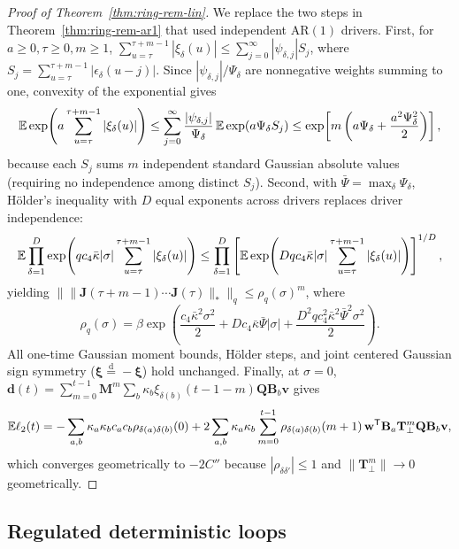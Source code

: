 \begin{proof}[Proof of Theorem~{\upshape\ref{thm:ring-rem-lin}}]
We replace the two steps in Theorem~\ref{thm:ring-rem-ar1} that used independent $\mathrm{AR}(1)$ drivers. First, for $a \ge 0, \tau \ge 0, m \ge 1$, $\sum_{u=\tau}^{\tau+m-1} |\xi_\delta(u)| \le \sum_{j=0}^{\infty} |\psi_{\delta,j}| S_j$, where $S_j = \sum_{u=\tau}^{\tau+m-1} |\epsilon_\delta(u - j)|$. Since $|\psi_{\delta,j}|/\Psi_\delta$ are nonnegative weights summing to one, convexity of the exponential gives
\[
\mathbb{E}\exp\!\left(a\sum_{u=\tau}^{\tau+m-1} |\xi_\delta(u)|\right) \le \sum_{j=0}^{\infty} \frac{|\psi_{\delta,j}|}{\Psi_\delta}\,\mathbb{E}\exp(a\Psi_\delta S_j) \le \exp\!\left[m\left(a\Psi_\delta + \frac{a^2\Psi_\delta^2}{2}\right)\right],
\]
because each $S_j$ sums $m$ independent standard Gaussian absolute values (requiring no independence among distinct $S_j$). Second, with $\bar{\Psi} = \max_\delta \Psi_\delta$, H\"older's inequality with $D$ equal exponents across drivers replaces driver independence:
\[
\mathbb{E}\prod_{\delta=1}^D \exp\!\left(q c_4\bar{\kappa}|\sigma|\sum_{u=\tau}^{\tau+m-1} |\xi_\delta(u)|\right) \le \prod_{\delta=1}^D \left[\mathbb{E}\exp\!\left(D q c_4\bar{\kappa}|\sigma|\sum_{u=\tau}^{\tau+m-1} |\xi_\delta(u)|\right)\right]^{1/D},
\]
yielding $\bigl\|\|\mathbf{J}(\tau + m - 1)\cdots\mathbf{J}(\tau)\|_*\bigr\|_q \le \rho_q(\sigma)^m$, where
\[
\rho_q(\sigma) = \beta\exp\!\left(\frac{c_4\bar{\kappa}^2\sigma^2}{2} + D c_4\bar{\kappa}\bar{\Psi}|\sigma| + \frac{D^2 q c_4^2\bar{\kappa}^2\bar{\Psi}^2\sigma^2}{2}\right).
\]
All one-time Gaussian moment bounds, H\"older steps, and joint centered Gaussian sign symmetry ($\boldsymbol{\xi} \stackrel{\mathrm{d}}{=} -\boldsymbol{\xi}$) hold unchanged. Finally, at $\sigma = 0$, $\mathbf{d}(t) = \sum_{m=0}^{t-1} \mathbf{M}^m \sum_b \kappa_b\xi_{\delta(b)}(t - 1 - m)\mathbf{Q}\mathbf{B}_b\mathbf{v}$ gives
\[
\mathbb{E}\ell_2(t) = -\sum_{a,b} \kappa_a\kappa_b c_a c_b\rho_{\delta(a)\delta(b)}(0) + 2\sum_{a,b} \kappa_a\kappa_b \sum_{m=0}^{t-1} \rho_{\delta(a)\delta(b)}(m + 1)\,\mathbf{w}^{\mathsf{T}}\mathbf{B}_a\mathbf{T}_\perp^m\mathbf{Q}\mathbf{B}_b\mathbf{v},
\]
which converges geometrically to $-2C''$ because $|\rho_{\delta\delta'}| \le 1$ and $\|\mathbf{T}_\perp^m\| \to 0$ geometrically.
\end{proof}

\subsection{Regulated deterministic loops}\label{subsec:app-ring-reg}

